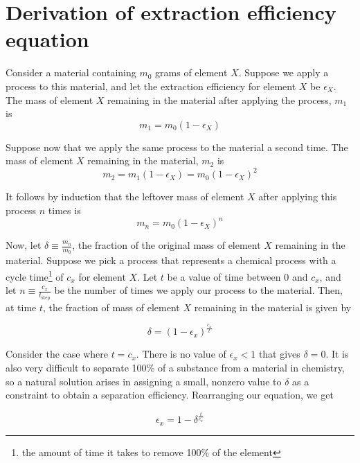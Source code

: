 \chapter{Derivation of extraction efficiency equation}
\label{appex:extraction-efficiency}

Consider a material containing $m_0$ grams of element $X$. Suppose we apply
a process to this material, and let the extraction efficiency for element $X$ be
$\epsilon_{X}$. The mass of element $X$ remaining in the material after applying
the process, $m_{1}$ is
\begin{equation}
   m_{1} = m_0(1-\epsilon_{X}) 
\end{equation}

Suppose now that we apply the same process to the material a second time. The mass of element $X$ remaining in the material, $m_{2}$ is 
\begin{equation}
    m_{2} = m_{1}(1-\epsilon_{X}) = m_0(1-\epsilon_{X})^{2}
\end{equation}

It follows by induction that the leftover mass of element $X$ after applying this
process $n$ times is
\begin{equation}
    m_{n} = m_0(1-\epsilon_{X})^{n}
\end{equation}

Now, let $\delta \equiv \frac{m_{n}}{m_0}$, the fraction of the original mass of
element $X$ remaining in the material. Suppose we pick a process that represents
a chemical process with a cycle time\footnote{the amount of time it takes
to remove 100\% of the element} of $c_{x}$ for element $X$. Let $t$ be a value
of time between 0 and $c_{x}$, and let $n \equiv \frac{c_{x}}{t_\text{step}}$ be
the number of times we apply our process to the material. Then, at time $t$, the
fraction of mass of element $X$ remaining in the material is given by

\begin{equation}
    \delta = (1-\epsilon_{x})^{\frac{c_{x}}{t}}
\end{equation}

Consider the case where $t=c_{x}$. There is no value of $\epsilon_{x} < 1$ that
gives $\delta = 0$. It is also very difficult to separate 100\% of a substance
from a material in chemistry, so a natural solution arises in assigning a small,
nonzero value to $\delta$ as a constraint to obtain a separation efficiency.
Rearranging our equation, we get

\begin{equation}
    \epsilon_{x} = 1 - \delta^{\frac{t}{c_{x}}}
\end{equation}

